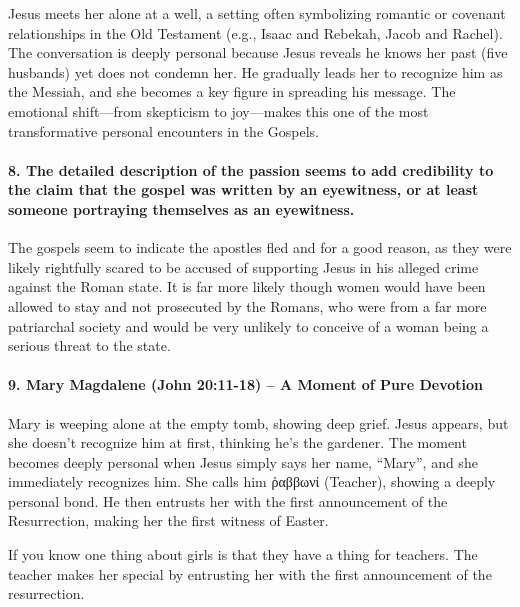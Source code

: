 Jesus meets her alone at a well, a setting often symbolizing romantic or covenant relationships in the Old Testament (e.g., Isaac and Rebekah, Jacob and Rachel).
The conversation is deeply personal because Jesus reveals he knows her past (five husbands) yet does not condemn her.
He gradually leads her to recognize him as the Messiah, and she becomes a key figure in spreading his message.
The emotional shift---from skepticism to joy---makes this one of the most transformative personal encounters in the Gospels.

\paragraph{8.
The detailed description of the passion seems to add credibility to the claim that the gospel was written by an eyewitness, or at least someone portraying themselves as an eyewitness.}\label{par:the-detailed-description-of-the-passion-seems-to-add-credibility-to-the-claim-that-the-gospel-was-written-by-an-eyewitness-or-at-least-someone-portraying-themselves-as-an-eyewitness.}

The gospels seem to indicate the apostles fled and for a good reason, as they were likely rightfully scared to be accused of supporting Jesus in his alleged crime against the Roman state.
It is far more likely though women would have been allowed to stay and not prosecuted by the Romans, who were from a far more patriarchal society and would be very unlikely to conceive of a woman being a serious threat to the state.

\paragraph{9.
Mary Magdalene (John 20:11-18) -- A Moment of Pure Devotion}\label{par:mary-magdalene-john-2011-18-a-moment-of-pure-devotion}

Mary is weeping alone at the empty tomb, showing deep grief.
Jesus appears, but she doesn't recognize him at first, thinking he's the gardener.
The moment becomes deeply personal when Jesus simply says her name, ``Mary'', and she immediately recognizes him.
She calls him ῥαββωνί (Teacher), showing a deeply personal bond.
He then entrusts her with the first announcement of the Resurrection, making her the first witness of Easter.

If you know one thing about girls is that they have a thing for teachers.
The teacher makes her special by entrusting her with the first announcement of the resurrection.

